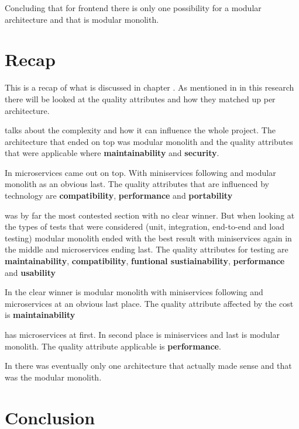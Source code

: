 Concluding that for frontend there is only one possibility for a modular architecture and that is modular monolith.

\section{Recap}

This is a recap of what is discussed in chapter . As mentioned in  in this research there will be looked at the quality attributes and how they matched up per architecture.

 talks about the complexity and how it can influence the whole project. The architecture that ended on top was modular monolith and the quality attributes that were applicable where \textbf{maintainability} and \textbf{security}.

In  microservices came out on top. With miniservices following and modular monolith as an obvious last. The quality attributes that are influenced by technology are \textbf{compatibility}, \textbf{performance} and \textbf{portability}

 was by far the most contested section with no clear winner. But when looking at the types of tests that were considered (unit, integration, end-to-end and load testing) modular monolith ended with the best result with miniservices again in the middle and microservices ending last. The quality attributes for testing are \textbf{maintainability}, \textbf{compatibility}, \textbf{funtional sustiainability}, \textbf{performance} and \textbf{usability}

In  the clear winner is modular monolith with miniservices following and microservices at an obvious last place. The quality attribute affected by the cost is \textbf{maintainability}

 has microservices at first. In second place is miniservices and last is modular monolith. The quality attribute applicable is \textbf{performance}.

In  there was eventually only one architecture that actually made sense and that was the modular monolith.

\section{Conclusion}

